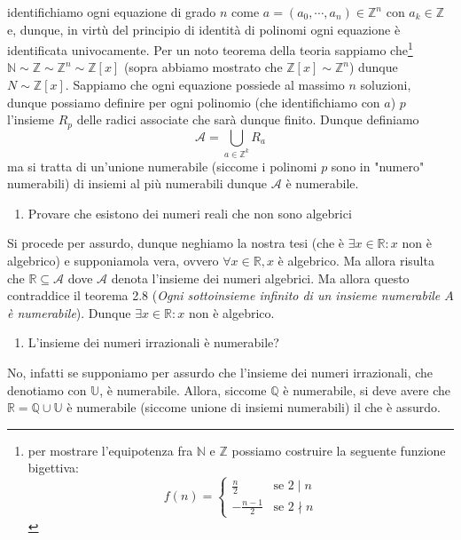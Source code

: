 \documentclass{report}
\begin{document}
\begin{mysolution}
	identifichiamo ogni equazione di grado $n$ come $a = (a_0, \cdots , a_n) \in \mathbb{Z}^n$ con $a_k \in \mathbb{Z}$ e, dunque, in virtù del principio di identità di polinomi ogni equazione è identificata univocamente. Per un noto teorema della teoria sappiamo che\footnote{per mostrare l'equipotenza fra $\mathbb{N}$ e $\mathbb{Z}$ possiamo costruire la seguente funzione bigettiva: \begin{equation*}
	f(n) = \begin{cases} \frac{n}{2} & \text{se } 2 \mid n \\ -\frac{n-1}{2} & \text{se } 2 \nmid n \end{cases}	
\end{equation*}
} $\mathbb{N} \sim \mathbb{Z} \sim \mathbb{Z}^n \sim \mathbb{Z}[x]$ (sopra abbiamo mostrato che $\mathbb{Z}[x] \sim \mathbb{Z}^n$) dunque $N \sim \mathbb{Z}[x]$. Sappiamo che ogni equazione possiede al massimo $n$ soluzioni, dunque possiamo definire per ogni polinomio (che identifichiamo con $a$) $p$ l'insieme $R_p$ delle radici associate che sarà dunque finito. Dunque definiamo $$\mathcal{A} = \bigcup_{a \in \mathbb{Z}^k} R_a$$ ma si tratta di un'unione numerabile (siccome i polinomi $p$ sono in "numero" numerabili) di insiemi al più numerabili dunque $\mathcal{A}$ è numerabile.
\end{mysolution}
\begin{enumerate}[resume, label=\protect\circled{\arabic*}]
	\item Provare che esistono dei numeri reali che non sono algebrici
\end{enumerate}
\begin{mysolution}
	Si procede per assurdo, dunque neghiamo la nostra tesi (che è $\exists x \in \mathbb{R}: x$ non è algebrico) e supponiamola vera, ovvero $\forall x \in \mathbb{R}, x$ è algebrico. Ma allora risulta che $\mathbb{R} \subseteq \mathcal{A}$ dove $\mathcal{A}$ denota l'insieme dei numeri algebrici. Ma allora questo contraddice il teorema 2.8 (\emph{Ogni sottoinsieme infinito di un insieme numerabile $A$ è numerabile}). Dunque $\exists x \in \mathbb{R}: x$ non è algebrico.
\end{mysolution}
\begin{enumerate}[resume, label=\protect\circled{\arabic*}]
	\item L'insieme dei numeri irrazionali è numerabile?
\end{enumerate}
\begin{mysolution} No, infatti se supponiamo per assurdo che l'insieme dei numeri irrazionali, che denotiamo con $\mathbb{U}$, è numerabile. Allora, siccome $\mathbb{Q}$ è numerabile, si deve avere che $\mathbb{R} = \mathbb{Q} \cup \mathbb{U}$ è numerabile (siccome unione di insiemi numerabili) il che è assurdo.
\end{mysolution}
\end{document}
